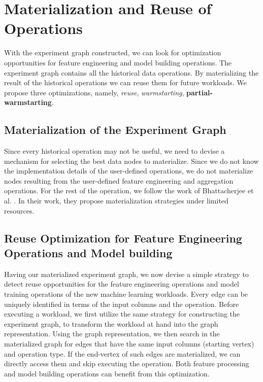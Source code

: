 \section{Materialization and Reuse of Operations}\label{sec-materializaiton-and-reuse}
With the experiment graph constructed, we can look for optimization opportunities for feature engineering and model building operations.
The experiment graph contains all the historical data operations.
By materializing the result of the historical operations we can reuse them for future workloads.
We propose three optimizations, namely, \textit{reuse}, \textit{warmstarting}, \textbf{partial-warmstarting}.

\subsection{Materialization of the Experiment Graph}
Since every historical operation may not be useful, we need to devise a mechanism for selecting the best data nodes to materialize.
Since we do not know the implementation details of the user-defined operations, we do not materialize nodes resulting from the user-defined feature engineering and aggregation operations.
For the rest of the operation, we follow the work of Bhattacherjee et al. \cite{bhattacherjee2015principles}.
In their work, they propose materialization strategies under limited resources.

\subsection{Reuse Optimization for Feature Engineering Operations and Model building}
Having our materialized experiment graph, we now devise a simple strategy to detect reuse opportunities for the feature engineering operations and model training operations of the new machine learning workloads.
Every edge can be uniquely identified in terms of the input columns and the operation.
Before executing a workload, we first utilize the same strategy for constructing the experiment graph, to transform the workload at hand into the graph representation.
Using the graph representation, we then search in the materialized graph for edges that have the same input columns (starting vertex) and operation type.
If the end-vertex of such edges are materialized, we can directly access them and skip executing the operation.
Both feature processing and model building operations can benefit from this optimization.

